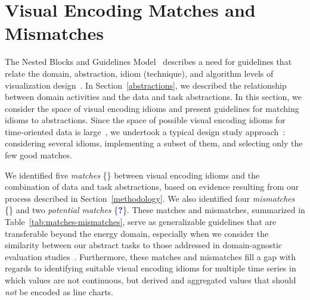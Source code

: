 \documentclass[journal]{vgtc}                %
\newcommand*\match{\textcolor{darkGreen}{\ding{52}}}
\newcommand*\mismatch{\textcolor{red}{\ding{54}}}
\newcommand*\posmatch{\textcolor{blue}{{\bf ?}}}
\newcommand{\tm}[1]{\textcolor{red}{#1}}
\begin{document}

\section{Visual Encoding Matches and Mismatches}
\label{design:visenc}


The Nested Blocks and Guidelines Model~\cite{Meyer2013} describes a need for guidelines that relate the domain, abstraction, idiom (technique), and algorithm levels of visualization design~\cite{Munzner2009,Munzner2014}.
In Section~\ref{abstractions}, we described the relationship between domain activities and the data and task abstractions.
In this section, we consider the space of visual encoding idioms and present guidelines for matching idioms to abstractions. 
Since the space of possible visual encoding idioms for time-oriented data is large~\cite{Aigner2011}, we undertook a typical design study approach~\cite{Sedlmair2012}: considering several idioms, implementing a subset of them, and selecting only the few good matches.

We identified five {\it matches} \{\match\} between visual encoding idioms and the combination of data and task abstractions, based on evidence resulting from our process described in Section~\ref{methodology}. 
We also identified four {\it mismatches} \{\mismatch\} and two {\it potential matches} \{\posmatch\}. 
These matches and mismatches, summarized in Table~\ref{tab:matches-mismatches}, serve as generalizable guidelines that are transferable beyond the energy domain, especially when we consider the similarity between our abstract tasks to those addressed in domain-agnostic evaluation studies~\cite{Albers2014,Javed2010}.
Furthermore, these matches and mismatches fill a gap with regards to identifying suitable visual encoding idioms for multiple time series in which values are not continuous, but derived and aggregated values that should {\it not} be encoded as line charts.
\end{document}
